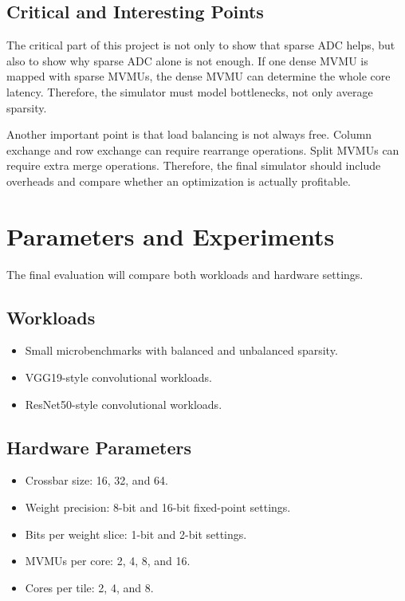 \documentclass[11pt]{article}
\begin{document}
\subsection{Critical and Interesting Points}

The critical part of this project is not only to show that sparse ADC helps, but also to show why sparse ADC alone is not enough. If one dense MVMU is mapped with sparse MVMUs, the dense MVMU can determine the whole core latency. Therefore, the simulator must model bottlenecks, not only average sparsity.

Another important point is that load balancing is not always free. Column exchange and row exchange can require rearrange operations. Split MVMUs can require extra merge operations. Therefore, the final simulator should include overheads and compare whether an optimization is actually profitable.

\section{Parameters and Experiments}

The final evaluation will compare both workloads and hardware settings.

\subsection{Workloads}

\begin{itemize}
    \item Small microbenchmarks with balanced and unbalanced sparsity.
    \item VGG19-style convolutional workloads.
    \item ResNet50-style convolutional workloads.
\end{itemize}

\subsection{Hardware Parameters}

\begin{itemize}
    \item Crossbar size: 16, 32, and 64.
    \item Weight precision: 8-bit and 16-bit fixed-point settings.
    \item Bits per weight slice: 1-bit and 2-bit settings.
    \item MVMUs per core: 2, 4, 8, and 16.
    \item Cores per tile: 2, 4, and 8.
\end{itemize}
\end{document}
